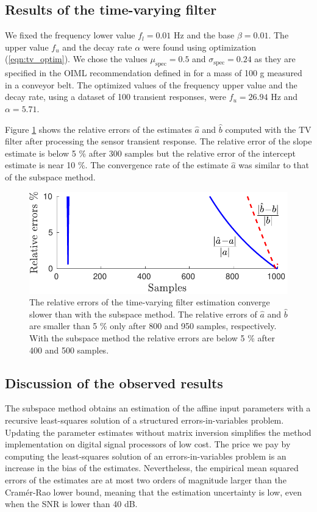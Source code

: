 \subsection{Results of the time-varying filter}

We fixed the frequency lower value $f_l=0.01$ Hz and the base $\beta = 0.01$. 
The upper value $f_u$ and the decay rate $\alpha$ were found using optimization (\ref{eqn:tv_optim}). 
We chose the values $\mu_{\mathrm{spec}}=0.5$ and $\sigma_{\mathrm{spec}}=0.24$ as they are specified in the OIML recommendation defined in \citet{OIML_R51_1} for a mass of 100 g measured in a conveyor belt.
The optimized values of the frequency upper value and the decay rate, using a dataset of 100 transient responses, were $f_u = 26.94$ Hz and $\alpha = 5.71$.

Figure \ref{fig:rele_tv_40dB_s1} shows the relative errors of the estimates $\widehat{a}$ and $\widehat{b}$ computed with the TV filter after processing the sensor transient response.
The relative error of the slope estimate is below 5 \% after 300 samples but the relative error of the intercept estimate is near 10 \%.
The convergence rate of the estimate $\widehat{a}$ was similar to that of the subspace method.

\begin{figure}[!htbp]
\centering
\includegraphics[width=0.69\columnwidth]{./ChapterRampInput/fig/Fig_9.pdf} 
\caption{ \label{fig:rele_tv_40dB_s1} The relative errors of the time-varying filter estimation converge slower than with the subspace method. 
The relative errors of $\widehat{a}$ and $\widehat{b}$ are smaller than 5 \% only after 800 and 950 samples, respectively.
With the subspace method the relative errors are below 5 \% after 400 and 500 samples. }
\end{figure}



\subsection{Discussion of the observed results}

The subspace method obtains an estimation of the affine input parameters with a recursive least-squares solution of a structured errors-in-variables problem.
Updating the parameter estimates without matrix inversion simplifies the method implementation on digital signal processors of low cost.
The price we pay by computing the least-squares solution of an errors-in-variables problem is an increase in the bias of the estimates.
Nevertheless, the empirical mean squared errors of the estimates are at most two orders of magnitude larger than the Cram\'er-Rao lower bound, meaning that the estimation uncertainty is low, even when the SNR is lower than 40 dB.


